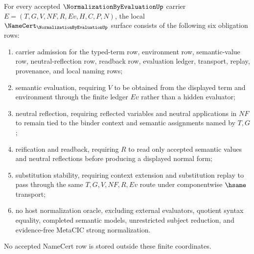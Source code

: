\begin{theorem}
\label{thm:normalization-by-evaluation-namecert-obligations}
For every accepted $\NormalizationByEvaluationUp$ carrier $E=(T,G,V,NF,R,Ev,H,C,P,N)$, the local $\NameCert_{\NormalizationByEvaluationUp}$ surface consists of the following six obligation rows:
\begin{enumerate}
\item carrier admission for the typed-term row, environment row, semantic-value row, neutral-reflection row, readback row, evaluation ledger, transport, replay, provenance, and local naming rows;
\item semantic evaluation, requiring $V$ to be obtained from the displayed term and environment through the finite ledger $Ev$ rather than a hidden evaluator;
\item neutral reflection, requiring reflected variables and neutral applications in $NF$ to remain tied to the binder context and semantic assignments named by $T,G$;
\item reification and readback, requiring $R$ to read only accepted semantic values and neutral reflections before producing a displayed normal form;
\item substitution stability, requiring context extension and substitution replay to pass through the same $T,G,V,NF,R,Ev$ route under componentwise $\hsame$ transport;
\item no host normalization oracle, excluding external evaluators, quotient syntax equality, completed semantic models, unrestricted subject reduction, and evidence-free MetaCIC strong normalization.
\end{enumerate}
No accepted NameCert row is stored outside these finite coordinates.
\end{theorem}
